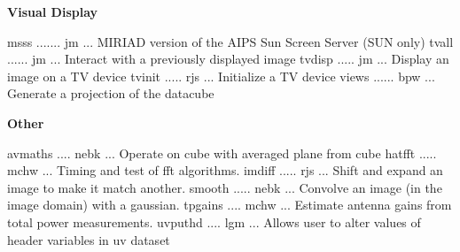 \par\centerline {\bf Visual Display}
{\eightpoint\begintt
msss ....... jm   ... MIRIAD version of the AIPS Sun Screen Server (SUN only) 
tvall ...... jm   ... Interact with a previously displayed image 
tvdisp ..... jm   ... Display an image on a TV device 
tvinit ..... rjs  ... Initialize a TV device 
views ...... bpw  ... Generate a projection of the datacube 
\endtt}
\par\centerline {\bf Other}
{\eightpoint\begintt
avmaths .... nebk ... Operate on cube with averaged plane from cube 
hatfft ..... mchw ... Timing and test of fft algorithms. 
imdiff ..... rjs  ... Shift and expand an image to make it match another. 
smooth ..... nebk ... Convolve an image (in the image domain) with a gaussian. 
tpgains .... mchw ... Estimate antenna gains from total power measurements. 
\endtt}
{\eightpoint\begintt
uvputhd .... lgm  ... Allows user to alter values of header variables in uv dataset 
\endtt}
